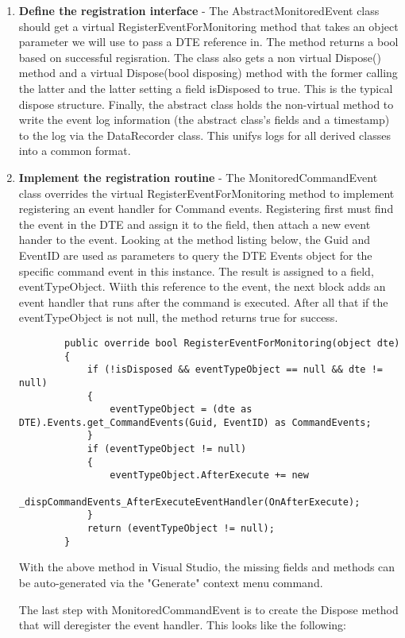 \begin{enumerate}
\item {\bf Define the registration interface } - 
The AbstractMonitoredEvent class should get a virtual RegisterEventForMonitoring method that takes an object parameter we will use to pass a DTE reference in.  The method returns a bool based on successful regisration.  The class also gets a non virtual Dispose() method  and a virtual Dispose(bool disposing) method with the former calling the latter and the latter setting a field isDisposed to true. This is the typical dispose structure.  Finally, the abstract class holds the non-virtual method to write the event log information (the abstract class's fields and a timestamp) to the log via the DataRecorder class.  This unifys logs for all derived classes into a common format.

\item {\bf Implement the registration routine} - 
The MonitoredCommandEvent class overrides the virtual RegisterEventForMonitoring method to implement registering an event handler for Command events.  Registering first must find the event in the DTE and assign it to the field, then attach a new event hander to the event.  Looking at the method listing below, the Guid and EventID are used as parameters to query the DTE Events object for the specific command event in this instance.  The result is assigned to a field, eventTypeObject.  Wiith this reference to the event, the next block adds an event handler that runs after the command is executed.  After all that if the eventTypeObject is not null, the method returns true for success.
\begin{lstlisting}
        public override bool RegisterEventForMonitoring(object dte)
        {
            if (!isDisposed && eventTypeObject == null && dte != null)
            {
                eventTypeObject = (dte as DTE).Events.get_CommandEvents(Guid, EventID) as CommandEvents;
            }
            if (eventTypeObject != null)
            {
                eventTypeObject.AfterExecute += new 
			_dispCommandEvents_AfterExecuteEventHandler(OnAfterExecute);
            }
            return (eventTypeObject != null);
        }
\end{lstlisting}

With the above method in Visual Studio, the missing fields and methods can be auto-generated via the "Generate" context menu command.  

The last step with MonitoredCommandEvent is to create the Dispose method that will deregister the event handler. This looks like the following:


\end{enumerate}
